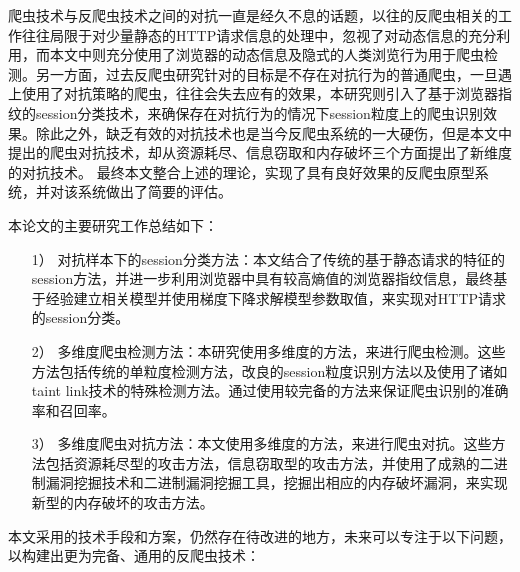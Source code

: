 \documentclass[doctor,privacy,twoside]{buaa_mac}
\begin{document}
%

%

%
\summary

爬虫技术与反爬虫技术之间的对抗一直是经久不息的话题，以往的反爬虫相关的工作往往局限于对少量静态的HTTP请求信息的处理中，忽视了对动态信息的充分利用，而本文中则充分使用了浏览器的动态信息及隐式的人类浏览行为用于爬虫检测。另一方面，过去反爬虫研究针对的目标是不存在对抗行为的普通爬虫，一旦遇上使用了对抗策略的爬虫，往往会失去应有的效果，本研究则引入了基于浏览器指纹的session分类技术，来确保存在对抗行为的情况下session粒度上的爬虫识别效果。除此之外，缺乏有效的对抗技术也是当今反爬虫系统的一大硬伤，但是本文中提出的爬虫对抗技术，却从资源耗尽、信息窃取和内存破坏三个方面提出了新维度的对抗技术。 最终本文整合上述的理论，实现了具有良好效果的反爬虫原型系统，并对该系统做出了简要的评估。

本论文的主要研究工作总结如下：
\begin{itemize}
\item[1）] 对抗样本下的session分类方法：本文结合了传统的基于静态请求的特征的session方法，并进一步利用浏览器中具有较高熵值的浏览器指纹信息，最终基于经验建立相关模型并使用梯度下降求解模型参数取值，来实现对HTTP请求的session分类。

\item[2）] 多维度爬虫检测方法：本研究使用多维度的方法，来进行爬虫检测。这些方法包括传统的单粒度检测方法，改良的session粒度识别方法以及使用了诸如taint link技术的特殊检测方法。通过使用较完备的方法来保证爬虫识别的准确率和召回率。

\item[3）] 多维度爬虫对抗方法：本文使用多维度的方法，来进行爬虫对抗。这些方法包括资源耗尽型的攻击方法，信息窃取型的攻击方法，并使用了成熟的二进制漏洞挖掘技术和二进制漏洞挖掘工具，挖掘出相应的内存破坏漏洞，来实现新型的内存破坏的攻击方法。
\end{itemize}

本文采用的技术手段和方案，仍然存在待改进的地方，未来可以专注于以下问题，以构建出更为完备、通用的反爬虫技术：
\end{document}
